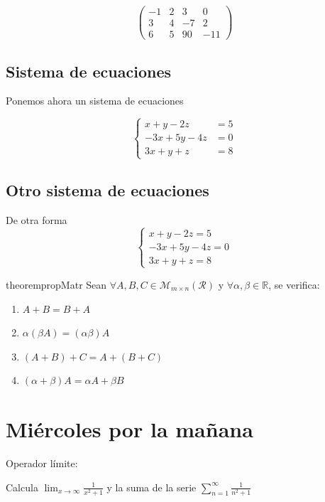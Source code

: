 \documentclass[10pt,a4paper]{article}
\begin{document}
\[
\left (
\begin{array}{rrr|r} 
	-1 & 2 &  3 &   0 \\ 
	3 & 4 & -7 &   2\\
	6 & 5 & 90 & -11
\end{array} 
\right )
\]

\subsection{Sistema de ecuaciones}
Ponemos ahora un sistema de ecuaciones

\[
\left \{
\begin{array}{rr} 
	x+y-2z & = 5 \\
	-3x+5y-4z & = 0 \\
	3x+y+z & = 8
\end{array}
\right .
\]

\subsection{Otro sistema de ecuaciones}
De otra forma
\[
\left \{
\begin{array}{r}
	x+y-2z  = 5 \\
	-3x+5y-4z  = 0 \\
	3x+y+z = 8
\end{array}
\right .
\]

\begin{restatable}{theorem}{propMatr} \label{thm:propMatr}
	Sean $\forall A, B, C\in \mathcal{M}_{m\times n}(\mathcal{R})$ y $\forall \alpha, \beta\in \mathbb{R}$, se verifica:
	\begin{multicols}{2}
		\begin{enumerate} 
			\item $A+B=B+A$
			\item $\alpha(\beta A)=(\alpha \beta)A$
			\item $(A+B)+C=A+(B+C)$
			\item $(\alpha+\beta)A=\alpha A + \beta B$
		\end{enumerate}
	\end{multicols}
\end{restatable}

\section[Miercoles mañana]{Miércoles por la mañana}

Operador límite:

Calcula $\lim_{x\to \infty}\frac{1}{x^2+1}$ y la suma de la serie $\sum_{n=1}^{\infty}\frac{1}{n^2+1}$
\end{document}
